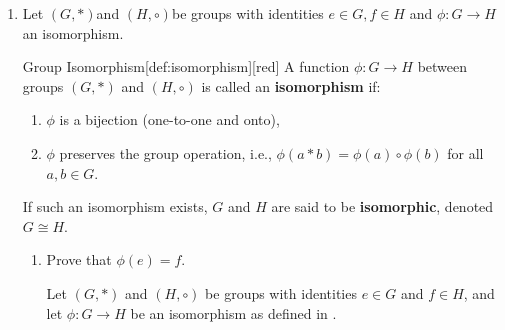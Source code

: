 \begin{enumerate}
\begin{enumerate}
\begin{subdisprove}
      The set $A B$ is computed as:
      \begin{align*}
        A B &= \{a b \mid a \in A, b \in B\} \\
        &= \{e e, e (13), (12) e, (12) (13)\} \\
        &= \{e, (13), (12), (12)(13)\} \\
        &= \{e, (12), (13), (123)\}.
      \end{align*}
      
      It is claimed that $A B$ is not a subgroup of $S_3$.
      To show this, consider the elements $(12)$ and $(13)$ in $A B$.
      Their product is $(12) (13) = (123)$, which is in $A B$.
      However, consider $(13) (12) = (132)$.
      It is verified that $(132) \notin A B = \{e, (12), (13), (123)\}$.
      
      If $A B$ were a subgroup, then for any $x, y \in A B$, the product $x y$ would be in $A B$.
      However, $(13) (12) = (132) \notin A B$, which contradicts the closure property.
      Thus, $A B$ is not a subgroup of $S_3$.
      
      Therefore, by counterexample, the statement that $A B$ is always a subgroup of $G$ is false.
    \end{subdisprove}
  \end{enumerate}


  
  \newpage


  \item Let $(G, *)$and $(H, \circ)$be groups with identities $e \in G, f \in H$ and $\phi: G \rightarrow H$ an isomorphism.
  \begin{define}{Group Isomorphism}[def:isomorphism][red]
    A function $\phi: G \to H$ between groups $(G, *)$ and $(H, \circ)$ is called an \textbf{isomorphism} if:
    \begin{enumerate}
      \item $\phi$ is a bijection (one-to-one and onto),
      \item $\phi$ preserves the group operation, i.e., $\phi(a * b) = \phi(a) \circ \phi(b)$ for all $a, b \in G$.
    \end{enumerate}
    If such an isomorphism exists, $G$ and $H$ are said to be \textbf{isomorphic}, denoted $G \cong H$.
  \end{define}
  \begin{enumerate}
    \item Prove that $\phi(e)=f$.
    \begin{subprove}
      Let $(G, *)$ and $(H, \circ)$ be groups with identities $e \in G$ and $f \in H$, 
      and let $\phi: G \to H$ be an isomorphism as defined in .
      

\end{subprove}
\end{enumerate}
\end{enumerate}
